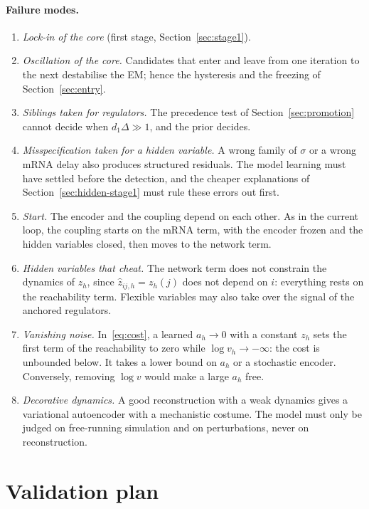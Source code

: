 \documentclass[a4paper, 11pt]{article}
\theoremstyle{plain}
\theoremstyle{remark}
\begin{document}
\paragraph{Failure modes.}
\begin{enumerate}[nosep]
\item \emph{Lock-in of the core} (first stage, Section~\ref{sec:stage1}).
\item \emph{Oscillation of the core.} Candidates that enter and leave from one iteration to the next destabilise the EM; hence the hysteresis and the freezing of Section~\ref{sec:entry}.
\item \emph{Siblings taken for regulators.} The precedence test of Section~\ref{sec:promotion} cannot decide when $d_1\Delta \gg 1$, and the prior decides.
\item \emph{Misspecification taken for a hidden variable.} A wrong family of $\sigma$ or a wrong mRNA delay also produces structured residuals. The model learning must have settled before the detection, and the cheaper explanations of Section~\ref{sec:hidden-stage1} must rule these errors out first.
\item \emph{Start.} The encoder and the coupling depend on each other. As in the current loop, the coupling starts on the mRNA term, with the encoder frozen and the hidden variables closed, then moves to the network term.
\item \emph{Hidden variables that cheat.} The network term does not constrain the dynamics of $z_h$, since $\hat z_{ij,h} = z_h(j)$ does not depend on $i$: everything rests on the reachability term. Flexible variables may also take over the signal of the anchored regulators.
\item \emph{Vanishing noise.} In~\eqref{eq:cost}, a learned $a_h \to 0$ with a constant $z_h$ sets the first term of the reachability to zero while $\log v_h \to -\infty$: the cost is unbounded below. It takes a lower bound on $a_h$ or a stochastic encoder. Conversely, removing $\log v$ would make a large $a_h$ free.
\item \emph{Decorative dynamics.} A good reconstruction with a weak dynamics gives a variational autoencoder with a mechanistic costume. The model must only be judged on free-running simulation and on perturbations, never on reconstruction.
\end{enumerate}

\section{Validation plan}\label{sec:validation}
\end{document}
